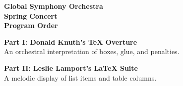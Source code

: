 \documentclass[12pt,b6paper]{article}
\begin{document}
\begin{center}
    {\large \bfseries Global Symphony Orchestra} \\
    \vspace{0.5cm}
    {\Huge \bfseries Spring Concert} \\
    \vspace{1cm}
    \textbf{Program Order}
\end{center}

\vspace{1cm}
\noindent
\textbf{Part I: Donald Knuth's TeX Overture} \\
An orchestral interpretation of boxes, glue, and penalties.

\vspace{1cm}
\noindent
\textbf{Part II: Leslie Lamport's LaTeX Suite} \\
A melodic display of list items and table columns.
\end{document}
